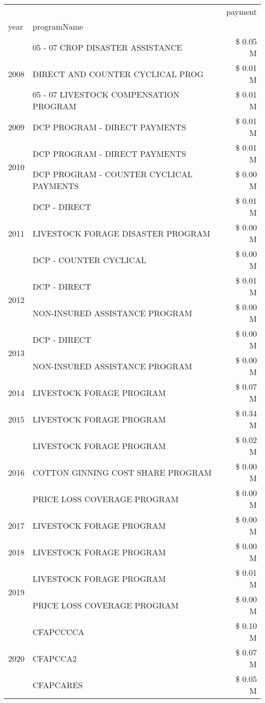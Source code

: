 \begin{tabular}{llr}
\toprule
 &  & payment \\
year & programName &  \\
\midrule
\multirow[t]{3}{*}{2008} & 05 - 07 CROP DISASTER ASSISTANCE & \$ 0.05 M \\
 & DIRECT AND COUNTER CYCLICAL PROG & \$ 0.01 M \\
 & 05 - 07 LIVESTOCK COMPENSATION PROGRAM & \$ 0.01 M \\
\cline{1-3}
2009 & DCP PROGRAM - DIRECT PAYMENTS & \$ 0.01 M \\
\cline{1-3}
\multirow[t]{2}{*}{2010} & DCP PROGRAM - DIRECT PAYMENTS & \$ 0.01 M \\
 & DCP PROGRAM - COUNTER CYCLICAL PAYMENTS & \$ 0.00 M \\
\cline{1-3}
\multirow[t]{3}{*}{2011} & DCP - DIRECT & \$ 0.01 M \\
 & LIVESTOCK FORAGE DISASTER PROGRAM & \$ 0.00 M \\
 & DCP - COUNTER CYCLICAL & \$ 0.00 M \\
\cline{1-3}
\multirow[t]{2}{*}{2012} & DCP - DIRECT & \$ 0.01 M \\
 & NON-INSURED ASSISTANCE PROGRAM & \$ 0.00 M \\
\cline{1-3}
\multirow[t]{2}{*}{2013} & DCP - DIRECT & \$ 0.00 M \\
 & NON-INSURED ASSISTANCE PROGRAM & \$ 0.00 M \\
\cline{1-3}
2014 & LIVESTOCK FORAGE PROGRAM & \$ 0.07 M \\
\cline{1-3}
2015 & LIVESTOCK FORAGE PROGRAM & \$ 0.34 M \\
\cline{1-3}
\multirow[t]{3}{*}{2016} & LIVESTOCK FORAGE PROGRAM & \$ 0.02 M \\
 & COTTON GINNING COST SHARE PROGRAM & \$ 0.00 M \\
 & PRICE LOSS COVERAGE PROGRAM & \$ 0.00 M \\
\cline{1-3}
2017 & LIVESTOCK FORAGE PROGRAM & \$ 0.00 M \\
\cline{1-3}
2018 & LIVESTOCK FORAGE PROGRAM & \$ 0.00 M \\
\cline{1-3}
\multirow[t]{2}{*}{2019} & LIVESTOCK FORAGE PROGRAM & \$ 0.01 M \\
 & PRICE LOSS COVERAGE PROGRAM & \$ 0.00 M \\
\cline{1-3}
\multirow[t]{3}{*}{2020} & CFAPCCCCA & \$ 0.10 M \\
 & CFAPCCA2 & \$ 0.07 M \\
 & CFAPCARES & \$ 0.05 M \\
\cline{1-3}
\bottomrule
\end{tabular}
